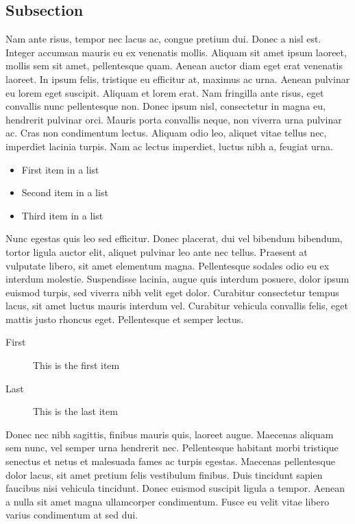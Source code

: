 \documentclass[10pt, a4paper, twocolumn]{article} %
\begin{document}

\subsection{Subsection}

Nam ante risus, tempor nec lacus ac, congue pretium dui. Donec a nisl est. Integer accumsan mauris eu ex venenatis mollis. Aliquam sit amet ipsum laoreet, mollis sem sit amet, pellentesque quam. Aenean auctor diam eget erat venenatis laoreet. In ipsum felis, tristique eu efficitur at, maximus ac urna. Aenean pulvinar eu lorem eget suscipit. Aliquam et lorem erat. Nam fringilla ante risus, eget convallis nunc pellentesque non. Donec ipsum nisl, consectetur in magna eu, hendrerit pulvinar orci. Mauris porta convallis neque, non viverra urna pulvinar ac. Cras non condimentum lectus. Aliquam odio leo, aliquet vitae tellus nec, imperdiet lacinia turpis. Nam ac lectus imperdiet, luctus nibh a, feugiat urna.

\begin{itemize}
	\item First item in a list 
	\item Second item in a list 
	\item Third item in a list
\end{itemize}

Nunc egestas quis leo sed efficitur. Donec placerat, dui vel bibendum bibendum, tortor ligula auctor elit, aliquet pulvinar leo ante nec tellus. Praesent at vulputate libero, sit amet elementum magna. Pellentesque sodales odio eu ex interdum molestie. Suspendisse lacinia, augue quis interdum posuere, dolor ipsum euismod turpis, sed viverra nibh velit eget dolor. Curabitur consectetur tempus lacus, sit amet luctus mauris interdum vel. Curabitur vehicula convallis felis, eget mattis justo rhoncus eget. Pellentesque et semper lectus.

\begin{description}
	\item[First] This is the first item
	\item[Last] This is the last item
\end{description}

Donec nec nibh sagittis, finibus mauris quis, laoreet augue. Maecenas aliquam sem nunc, vel semper urna hendrerit nec. Pellentesque habitant morbi tristique senectus et netus et malesuada fames ac turpis egestas. Maecenas pellentesque dolor lacus, sit amet pretium felis vestibulum finibus. Duis tincidunt sapien faucibus nisi vehicula tincidunt. Donec euismod suscipit ligula a tempor. Aenean a nulla sit amet magna ullamcorper condimentum. Fusce eu velit vitae libero varius condimentum at sed dui.
\end{document}
